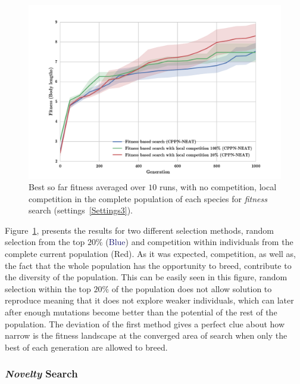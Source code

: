 \begin{figure}[t!]
\centering
\includegraphics[width=1.0\textwidth]{../Figures/Results/fitComp100_20percent.pdf}
\caption{Best so far fitness averaged over $10$ runs, with no competition, local competition in the complete population of each species for \emph{fitness} search (settings~\ref{Settings3}).}
\label{fig:fitComp100_20percent}
\end{figure}


Figure~\ref{fig:fitComp100_20percent}, presents the results for two different selection methods, random selection from the top $20\%$ (\textcolor{MidnightBlue}{Blue}) and competition within individuals from the complete current population (\textcolor{BrickRed}{Red}). As it was expected, competition, as well as, the fact that the whole population has the opportunity to breed, contribute to the diversity of the population. This can be easily seen in this figure, random selection within the top $20\%$ of the population does not allow solution to reproduce meaning that it does not explore weaker individuals, which can later after enough mutations become better than the potential of the rest of the population. The deviation of the first method gives a perfect clue about how narrow is the fitness landscape at the converged area of search when only the best of each generation are allowed to breed.

\subsubsection*{\emph{Novelty} Search}

